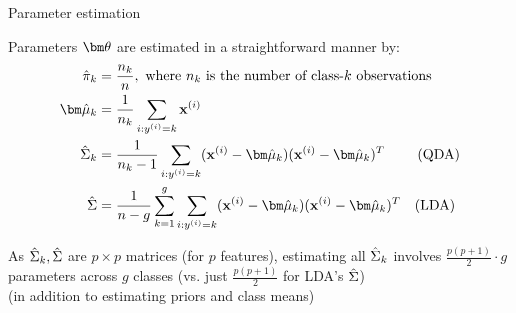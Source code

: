 \documentclass[11pt,compress,t,notes=noshow, xcolor=table]{beamer}
\begin{document}
\begin{vbframe}{Parameter estimation}

Parameters $\thetav$ are estimated in a straightforward manner by:\\
\begin{equation*}
\begin{aligned}
\pikh &= \frac{n_k}{n},\text{ where $n_k$ is the number of class-$k$ observations} \\
\mukh &= \frac{1}{n_k}\sum_{i:\yi = k} \xi \\
\Sigmah_k &= \frac{1}{n_k - 1} \sum_{i: \yi = k} (\xi - \mukh) (\xi - \mukh)^T \quad \quad \text{   (QDA)} \\
\Sigmah &= \frac{1}{n - g} \sumkg \sum_{i: \yi = k} (\xi - \mukh) (\xi - \mukh)^T \quad \text{(LDA)} \\
\end{aligned}
\end{equation*}

\lz

As $\hat \Sigma_k, \hat \Sigma$ are $p \times p$ matrices (for $p$ features), estimating all $\hat \Sigma_k$ involves $\frac{p(p+1)}{2} \cdot g$ parameters across $g$ classes (vs. just $\frac{p(p+1)}{2}$ for LDA's $\hat \Sigma$)\\
(in addition to estimating priors and class means)
\end{vbframe}
\end{document}
